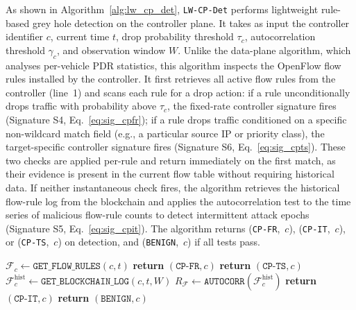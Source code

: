 \documentclass[12pt, a4paper]{report}
\begin{document}
As shown in Algorithm~\ref{alg:lw_cp_det}, 
\texttt{LW-CP-Det} performs lightweight rule-based grey hole 
detection on the controller plane. It takes as input the
controller identifier $c$, current time $t$, drop probability threshold
$\tau_c$, autocorrelation threshold $\gamma_c$, and observation window $W$.
Unlike the data-plane algorithm, which analyses per-vehicle PDR statistics,
this algorithm inspects the OpenFlow flow rules installed by the controller.
It first retrieves all active flow rules from the controller (line~1) and
scans each rule for a drop action: if a rule unconditionally drops traffic
with probability above $\tau_c$, the fixed-rate controller signature fires
(Signature S4, Eq.~\eqref{eq:sig_cpfr}); if a rule drops traffic conditioned
on a specific non-wildcard match field (e.g., a particular source IP or
priority class), the target-specific controller signature fires (Signature S6,
Eq.~\eqref{eq:sig_cpts}). These two checks are applied per-rule and return
immediately on the first match, as their evidence is present in the current
flow table without requiring historical data. If neither instantaneous check
fires, the algorithm retrieves the historical flow-rule log from the blockchain
and applies the autocorrelation test to the time series of malicious flow-rule
counts to detect intermittent attack epochs (Signature S5,
Eq.~\eqref{eq:sig_cpit}). The algorithm returns (\texttt{CP-FR},~$c$),
(\texttt{CP-IT},~$c$), or (\texttt{CP-TS},~$c$) on detection, and
(\texttt{BENIGN},~$c$) if all tests pass.

\begin{algorithm}[htb]
\caption{Lightweight Rule-Based Grey Hole Detection — Controller Plane (\texttt{LW-CP-Det})}
\begin{algorithmic}[1]
\small
{}
  \State $\mathcal{F}_c \gets \texttt{GET\_FLOW\_RULES}(c, t)$
      \State \textbf{return} $(\texttt{CP-FR}, c)$
    \EndIf
      \State \textbf{return} $(\texttt{CP-TS}, c)$
    \EndIf
  \EndFor
  \State $\mathcal{F}_c^{\text{hist}} \gets \texttt{GET\_BLOCKCHAIN\_LOG}(c, t, W)$
  \State $R_{\mathcal{F}} \gets \texttt{AUTOCORR}(\mathcal{F}_c^{\text{hist}})$
    \State \textbf{return} $(\texttt{CP-IT}, c)$
  \EndIf
  \State \textbf{return} $(\texttt{BENIGN}, c)$
\EndProcedure
\end{algorithmic}
\label{alg:lw_cp_det}
\end{algorithm}
\end{document}
